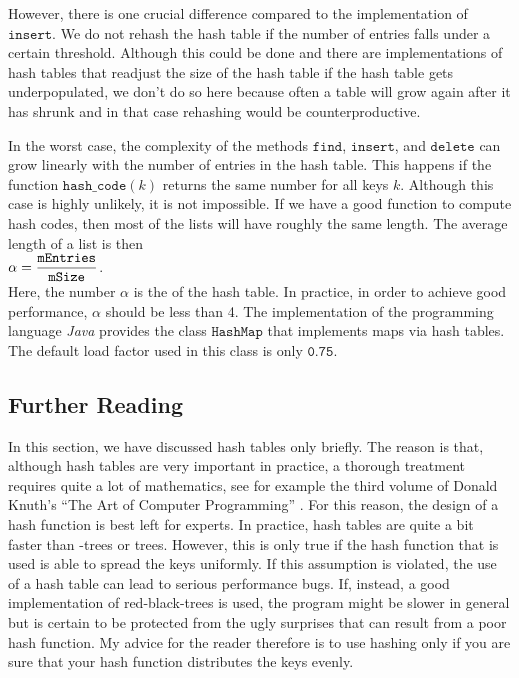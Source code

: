 However, there is one crucial difference compared to the implementation of $\texttt{insert}$.
We do not rehash the hash table if the number of entries falls under a certain threshold.
Although this could be done and there are implementations of hash tables that readjust the size of the
hash table if the hash table gets underpopulated, we don't do so here because often a table will
grow again after it has shrunk and in that case rehashing would be counterproductive.

In the worst case, the complexity of
the methods  $\texttt{find}$, $\texttt{insert}$, and $\texttt{delete}$ can grow linearly with the number
of entries in the hash table.  This happens if the function 
$\texttt{hash\_code}(k)$ returns the same number for all keys $k$.  Although this case is
highly unlikely, it is not impossible.  If we have a good function to compute hash codes, then
most of the  lists will have roughly the same length.  The average length of a list is then
 \\[0.2cm]
\hspace*{1.3cm}
 $\alpha = \displaystyle \frac{\texttt{mEntries}}{\texttt{mSize}}$. 
\\[0.2cm]
Here, the number $\alpha$ is the  of the hash table.  In practice, in order to
achieve good performance, $\alpha$ should be less than 4.  The implementation of the programming
language \textsl{Java} provides the class  $\texttt{HashMap}$ that implements maps via hash tables.
The default load factor used in this class is only $\texttt{0.75}$.

\subsection{Further Reading}
In this section, we have discussed hash tables only briefly.  The reason is that, although hash tables are very
important in practice, a thorough treatment requires quite a lot of mathematics, see for example the
third volume of Donald Knuth's ``The Art of Computer Programming'' \cite{knuth:1998b}.  For this
reason, the design of a hash function is best left for experts.  In practice, hash tables are
quite a bit faster than -trees or  trees.  However, this is only true if
the hash function that is used is able to spread the keys uniformly.  If this assumption is
violated, the use of a hash table can lead to serious performance 
bugs.  If, instead, a good
implementation of red-black-trees is used, the program might be slower in general but is certain to
be protected from the ugly surprises that can result from a poor hash function.  My advice for the reader
therefore is to use hashing only if you are sure that your hash function distributes the keys evenly.


